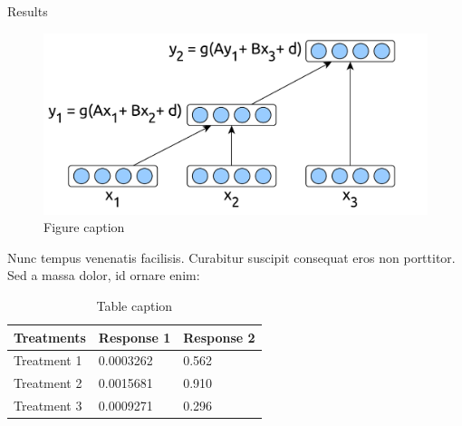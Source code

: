 \documentclass[final]{beamer}
\newlength{\onecolwid}
\newlength{\twocolwid}
\begin{document}
\begin{frame}[t]
\begin{columns}[t]
\begin{column}{\twocolwid}
\begin{columns}[t,totalwidth=\twocolwid]
        \begin{column}{\onecolwid} %


          \begin{block}{Results}

            \begin{figure}
              \includegraphics[width=0.8\linewidth]{fig2.pdf}
              \caption{Figure caption}
            \end{figure}

            Nunc tempus venenatis facilisis. Curabitur suscipit consequat eros non porttitor. Sed a massa dolor, id ornare enim:

            \begin{table}
              \vspace{2ex}
              \begin{tabular}{l l l}
                \toprule
                \textbf{Treatments} & \textbf{Response 1} & \textbf{Response 2}\\
                \midrule
                Treatment 1 & 0.0003262 & 0.562 \\
                Treatment 2 & 0.0015681 & 0.910 \\
                Treatment 3 & 0.0009271 & 0.296 \\
                \bottomrule
              \end{tabular}
              \caption{Table caption}
            \end{table}

          \end{block}



\end{column}
\end{columns}
\end{column}
\end{columns}
\end{frame}
\end{document}
